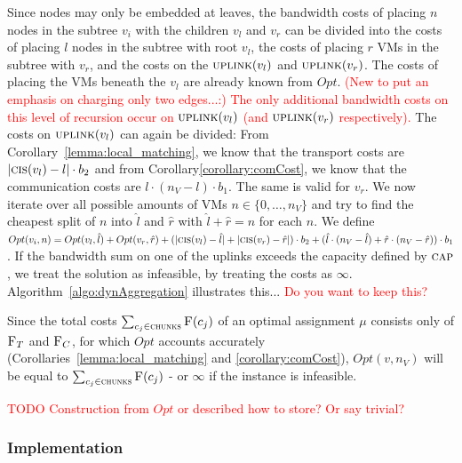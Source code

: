 \documentclass[9pt,twocolumn]{scrartcl}
\newcommand{\Capacity}{\ensuremath{\textsc{cap}}}
\newcommand{\carlo}[1]{\textcolor{red}{#1}}
\newcommand{\VmChunkAssignment}{\mu}
\newcommand{\SubstrateNode}{\ensuremath{v}}
\newcommand{\Chunks}{\ensuremath{\textsc{chunks}}}
\newcommand{\Opt}{\ensuremath{Opt}}
\newcommand{\Uplink}{\ensuremath{\textsc{uplink}}}
\newcommand{\ChunkCount}{\ensuremath{\textsc{cis}}}
\newcommand{\achunk}{\ensuremath{c}}
\newcommand{\Cost}{\textsc{F}}
\newcommand{\CostCom}{\ensuremath{b_1}}
\newcommand{\CostTrans}{\ensuremath{b_2}}
\newcommand{\Vms}{\ensuremath{n_V}}
\begin{document}
Since nodes may only be embedded at leaves, the bandwidth costs of placing $n$ nodes
in the subtree $\SubstrateNode_i$ with the children $\SubstrateNode_l$ and
$\SubstrateNode_r$ can be divided into the costs of placing $l$ nodes in the
subtree with root $\SubstrateNode_l$, the costs of placing
$r$ VMs in the subtree with $\SubstrateNode_r$, and the costs on the
$\Uplink(\SubstrateNode_l)$ and $\Uplink(\SubstrateNode_r)$. The costs of
placing the VMs beneath the $\SubstrateNode_l$ are already known from
$\Opt$. \carlo{(New to put an emphasis on charging only two edges...:) The only
additional bandwidth costs on this level of recursion occur on
$\Uplink(\SubstrateNode_l)$ (and $\Uplink(\SubstrateNode_r)$ respectively).}
The costs on $\Uplink(\SubstrateNode_l)$ can again be divided: From
Corollary~\ref{lemma:local_matching}, we know that the transport costs are
 $|\ChunkCount(\SubstrateNode_l) - l| \cdot \CostTrans$ and from
Corollary\ref{corollary:comCost}, we know that the communication costs are
$l\cdot (\Vms - l) \cdot \CostCom$. The same is valid for $\SubstrateNode_r$.
We now iterate over all possible amounts of VMs $n \in \{0,\dots,\Vms\}$ and
try to find the cheapest split of $n$ into $\hat l$ and $\hat r$ with
$\hat l + \hat r = n$ for each $n$. We define $\Opt(\SubstrateNode_i, n) =
\Opt(\SubstrateNode_{l}, \hat l) + \Opt(\SubstrateNode_{r}, \hat r) +
(|\ChunkCount(\SubstrateNode_{l}) - \hat
l|+|\ChunkCount(\SubstrateNode_{r}) - \hat r|) \cdot \CostTrans + (\hat
l\cdot (\Vms - \hat l) + \hat r\cdot (\Vms - \hat r)) \cdot \CostCom$. If the
bandwidth sum on one of the uplinks exceeds the capacity defined by
$\Capacity$, we treat the solution as infeasible, by treating the costs as
$\infty$. Algorithm~\ref{algo:dynAggregation} illustrates this... \carlo{Do you
want to keep this?}

Since the total costs $\sum_{\achunk_j \in
\Chunks}\Cost(\achunk_j)$ of an optimal assignment $\VmChunkAssignment$
consists only of $\Cost_T$ and $\Cost_C$, for which $\Opt$ accounts accurately
(Corollaries~\ref{lemma:local_matching} and \ref{corollary:comCost}),
$\Opt(\SubstrateNode, \Vms)$ will be equal to $\sum_{\achunk_j \in
\Chunks}\Cost(\achunk_j)$ - or $\infty$ if the instance is infeasible.

\carlo{TODO Construction from $\Opt$ or described how to store? Or say trivial?}

\subsubsection{Implementation}
\end{document}
